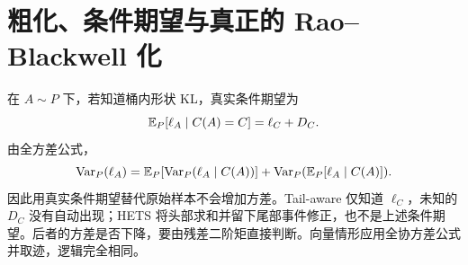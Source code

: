 \section{粗化、条件期望与真正的 Rao--Blackwell 化}
\label{inf:rao-blackwell}

在 $A\sim P$ 下，若知道桶内形状 KL，真实条件期望为
\begin{equation}
\mathbb E_P[\ell_A\mid C(A)=C]=\ell_C+D_C.
\end{equation}
由全方差公式，
\begin{equation}
\operatorname{Var}_P(\ell_A)
=\mathbb E_P[\operatorname{Var}_P(\ell_A\mid C(A))]
+\operatorname{Var}_P(\mathbb E_P[\ell_A\mid C(A)]).
\end{equation}
因此用真实条件期望替代原始样本不会增加方差。Tail-aware 仅知道 $\ell_C$，未知的 $D_C$ 没有自动出现；HETS 将头部求和并留下尾部事件修正，也不是上述条件期望。后者的方差是否下降，要由残差二阶矩直接判断。向量情形应用全协方差公式并取迹，逻辑完全相同。

